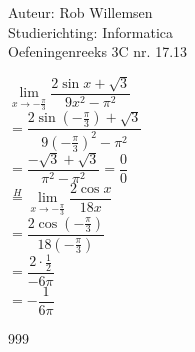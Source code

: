 \documentclass[a4paper]{article}
\newcommand{\limit}{\lim\limits}
\begin{document}
\noindent \large Auteur: Rob Willemsen \\
\noindent \large Studierichting: Informatica \\
\noindent \large Oefeningenreeks 3C nr. 17.13 \\

\medskip

\normalsize

$\limit_{x \rightarrow -\tfrac{\pi}{3}} \dfrac{2\sin x + \sqrt{3}}{9x^2 - \pi^2}$ \\  

$= \dfrac{2\sin(-\tfrac{\pi}{3}) + \sqrt{3}}{9(-\tfrac{\pi}{3})^2 - \pi^2}$ \\ 

$= \dfrac{-\sqrt{3} + \sqrt{3}}{\pi^2 - \pi^2} = \dfrac{0}{0}$ \\

$\overset{H}{=}\limit_{x \rightarrow -\tfrac{\pi}{3}} \dfrac{2\cos x}{18x}$ \\

$= \dfrac{2\cos(-\tfrac{\pi}{3})}{18(-\tfrac{\pi}{3})}$ \\

$= \dfrac{2\cdot \tfrac{1}{2}}{-6\pi}$ \\

$= -\dfrac{1}{6\pi}$ \\

\begin{thebibliography}{999}
\end{thebibliography}
\end{document}
